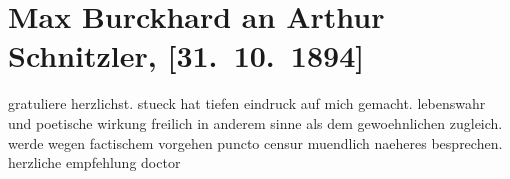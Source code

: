 

         \renewcommand{\erwaehnteOrte}{Orte: Wien}
         \renewcommand{\erwaehnteWerke}{Werke: Liebelei. Schauspiel in drei Akten}
               \section[Max Burckhard an Arthur Schnitzler, {[}31. 10. 1894{]}]{ Max Burckhard an Arthur Schnitzler, {[}31. 10. 1894{]}}\nopagebreak{}\rehead{ }\begin{ledgroupsized}[t]{13cm}\normalsize\beginnumbering \toendnotes[C]{\smallbreak\pagebreak[2]} 
\toendnotes[C]{\smallbreak}\pstart
           \noindent{}{\pb}gratuliere herzlichst. stueck hat tiefen eindruck auf
               mich gemacht. lebenswahr und poetische wirkung freilich in anderem sinne als dem
               gewoehnlichen zugleich. werde wegen factischem vorgehen puncto censur muendlich
               naeheres besprechen. herzliche empfehlung \spacefill\mbox{doctor \label{T_L00395-1v}\label{T_L00395-1h}}\pend
           
         
         \endnumbering{}\end{ledgroupsized}  \newcommand{\dateiname}{L00395}\newcommand{\titel}{Max Burckhard an Arthur Schnitzler, [31. 10. 1894]}\newcommand{\editorInnen}{Martin Anton Müller und Gerd-Hermann Susen}
      